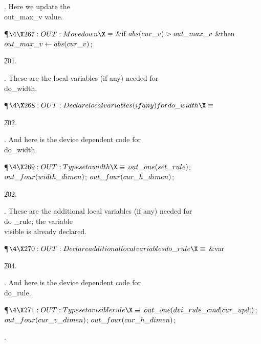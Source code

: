 . Here we update the \\{out\_max\_v} value.

\Y\P$\4\X267:OUT: Move down\X\S$\6
\&{if} $\\{abs}(\\{cur\_v})>\\{out\_max\_v}$ \1\&{then}\5
$\\{out\_max\_v}\gets\\{abs}(\\{cur\_v})$;\2\par
\U201.\fi

. These are the local variables (if any) needed for \\{do\_width}.

\Y\P$\4\X268:OUT: Declare local variables (if any) for \\{do\_width}\X\S$\par
\U202.\fi

. And here is the device dependent code for \\{do\_width}.

\Y\P$\4\X269:OUT: Typeset a \\{width}\X\S$\6
$\\{out\_one}(\\{set\_rule})$;\5
$\\{out\_four}(\\{width\_dimen})$;\5
$\\{out\_four}(\\{cur\_h\_dimen})$;\par
\U202.\fi

. These are the additional local variables (if any) needed for \\{do%
\_rule};
the variable \\{visible} is already declared.

\Y\P$\4\X270:OUT: Declare additional local variables \\{do\_rule}\X\S$\6
\4\&{var} \par
\U204.\fi

. And here is the device dependent code for \\{do\_rule}.

\Y\P$\4\X271:OUT: Typeset a visible \\{rule}\X\S$\6
$\\{out\_one}(\\{dvi\_rule\_cmd}[\\{cur\_upd}])$;\5
$\\{out\_four}(\\{cur\_v\_dimen})$;\5
$\\{out\_four}(\\{cur\_h\_dimen})$;\par
{}.\fi

